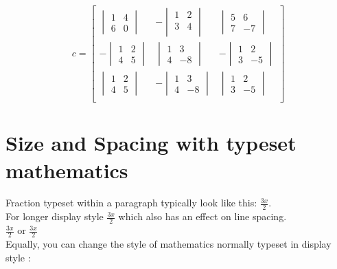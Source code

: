 \documentclass{report}
\begin{document}
\begin{enumerate}
\[
c= \begin{bmatrix}
    \begin{vmatrix}
        1 & 4 \\
        6 & 0
    \end{vmatrix} & - \begin{vmatrix}
        1 & 2 \\
        3 & 4 \\
    \end{vmatrix} & \begin{vmatrix}
        5 & 6 \\
        7 & -7
    \end{vmatrix} \\
    - \begin{vmatrix}
        1 & 2 \\
        4 & 5
    \end{vmatrix} & \begin{vmatrix}
        1 & 3 \\ 
        4 & -8
    \end{vmatrix} & - \begin{vmatrix}
        1 & 2 \\
        3 & -5 
    \end{vmatrix} \\
     \begin{vmatrix}
        1 & 2 \\
        4 & 5
    \end{vmatrix} & - \begin{vmatrix}
        1 & 3 \\ 
        4 & -8
    \end{vmatrix} & \begin{vmatrix}
        1 & 2 \\
        3 & -5 
    \end{vmatrix} \\
\end{bmatrix}
\]
\end{enumerate}

\section{Size and Spacing with typeset mathematics}
Fraction typeset within a paragraph typically look like this: \(\frac{3x}{2}\). \\
For longer display style \(\displaystyle \frac{3x}{2}\) which also has an effect on line spacing. \\
\(\scriptstyle  \frac{3x}{2}\) or \(\scriptscriptstyle \frac{3x}{2}\) \\
 Equally, you can change the style of mathematics normally typeset in display style :
\end{document}
